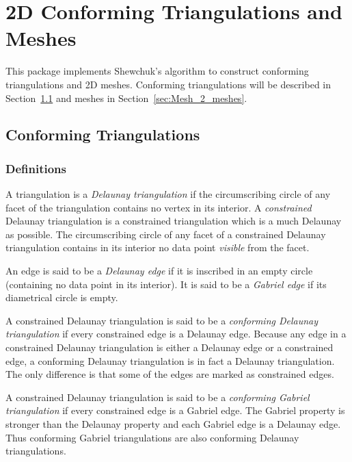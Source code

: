 \chapter{2D Conforming Triangulations and Meshes}
\label{user_chapter_2D_Meshes}


\minitoc

This package implements Shewchuk's algorithm \cite{s-mgdsa-00} to construct
conforming triangulations and 2D meshes. Conforming triangulations will be
described in Section~\ref{sec:Mesh_2_conforming_triangulation} and
meshes in Section~\ref{sec:Mesh_2_meshes}.

\section{Conforming Triangulations}
\label{sec:Mesh_2_conforming_triangulation}

\subsection{Definitions}
\label{sec:Mesh_2_conforming_definitions}

A triangulation is a \emph{Delaunay triangulation} if the circumscribing
circle of any facet of the triangulation contains no vertex in its
interior. A \emph{constrained} Delaunay triangulation is a constrained
triangulation which is a much Delaunay as possible. The circumscribing
circle of any facet of a constrained Delaunay triangulation contains in its
interior no data point \emph{visible} from the facet.

An edge is said to be a \emph{Delaunay edge} if it is inscribed in an empty
circle (containing no data point in its interior). It is said to be a
\emph{Gabriel edge} if its diametrical circle is empty.

A constrained Delaunay triangulation is said to be a \emph{conforming
  Delaunay triangulation} if every constrained edge is a Delaunay edge.
Because any edge in a constrained Delaunay triangulation is either a
Delaunay edge or a constrained edge, a conforming Delaunay triangulation is
in fact a Delaunay triangulation. The only difference is that some of the
edges are marked as constrained edges.

A constrained Delaunay triangulation is said to be a \emph{conforming
  Gabriel triangulation} if every constrained edge is a Gabriel edge. The
Gabriel property is stronger than the Delaunay property and each Gabriel
edge is a Delaunay edge. Thus conforming Gabriel triangulations are also
conforming Delaunay triangulations.

